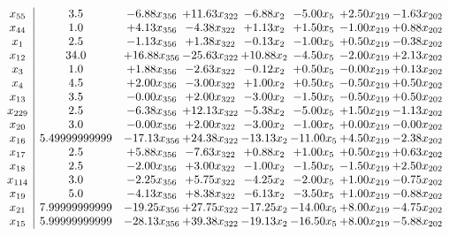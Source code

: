 \documentclass[8pt]{article}
\begin{document}
\[\begin{array}{c| c c@{\hskip 2pt} c@{\hskip 2pt} c@{\hskip 2pt} c@{\hskip 2pt} c@{\hskip 2pt} c@{\hskip 2pt} }
 x_{55}   &  3.5 & -6.88 x_{356} & + 11.63 x_{322} & -6.88 x_{2} & -5.00 x_{5} & +  2.50 x_{219} & -1.63 x_{202}\\
 x_{44}   &  1.0 & +  4.13 x_{356} & -4.38 x_{322} & +  1.13 x_{2} & +  1.50 x_{5} & -1.00 x_{219} & +  0.88 x_{202}\\
 x_{1}   &  2.5 & -1.13 x_{356} & +  1.38 x_{322} & -0.13 x_{2} & -1.00 x_{5} & +  0.50 x_{219} & -0.38 x_{202}\\
 x_{12}   &  34.0 & + 16.88 x_{356} & -25.63 x_{322} & + 10.88 x_{2} & -4.50 x_{5} & -2.00 x_{219} & +  2.13 x_{202}\\
 x_{3}   &  1.0 & +  1.88 x_{356} & -2.63 x_{322} & -0.12 x_{2} & +  0.50 x_{5} & -0.00 x_{219} & +  0.13 x_{202}\\
 x_{4}   &  4.5 & +  2.00 x_{356} & -3.00 x_{322} & +  1.00 x_{2} & +  0.50 x_{5} & -0.50 x_{219} & +  0.50 x_{202}\\
 x_{13}   &  3.5 & -0.00 x_{356} & +  2.00 x_{322} & -3.00 x_{2} & -1.50 x_{5} & -0.50 x_{219} & +  0.50 x_{202}\\
 x_{229}   &  2.5 & -6.38 x_{356} & + 12.13 x_{322} & -5.38 x_{2} & -5.00 x_{5} & +  1.50 x_{219} & -1.13 x_{202}\\
 x_{20}   &  3.0 & -0.00 x_{356} & +  2.00 x_{322} & -3.00 x_{2} & -1.00 x_{5} & +  0.00 x_{219} & -0.00 x_{202}\\
 x_{16}   &  5.49999999999 & -17.13 x_{356} & + 24.38 x_{322} & -13.13 x_{2} & -11.00 x_{5} & +  4.50 x_{219} & -2.38 x_{202}\\
 x_{17}   &  2.5 & +  5.88 x_{356} & -7.63 x_{322} & +  0.88 x_{2} & +  1.00 x_{5} & +  0.50 x_{219} & +  0.63 x_{202}\\
 x_{18}   &  2.5 & -2.00 x_{356} & +  3.00 x_{322} & -1.00 x_{2} & -1.50 x_{5} & -1.50 x_{219} & +  2.50 x_{202}\\
 x_{114}   &  3.0 & -2.25 x_{356} & +  5.75 x_{322} & -4.25 x_{2} & -2.00 x_{5} & +  1.00 x_{219} & -0.75 x_{202}\\
 x_{19}   &  5.0 & -4.13 x_{356} & +  8.38 x_{322} & -6.13 x_{2} & -3.50 x_{5} & +  1.00 x_{219} & -0.88 x_{202}\\
 x_{21}   &  7.99999999999 & -19.25 x_{356} & + 27.75 x_{322} & -17.25 x_{2} & -14.00 x_{5} & +  8.00 x_{219} & -4.75 x_{202}\\
 x_{15}   &  5.99999999999 & -28.13 x_{356} & + 39.38 x_{322} & -19.13 x_{2} & -16.50 x_{5} & +  8.00 x_{219} & -5.88 x_{202}\\

\end{array}\]
\end{document}
